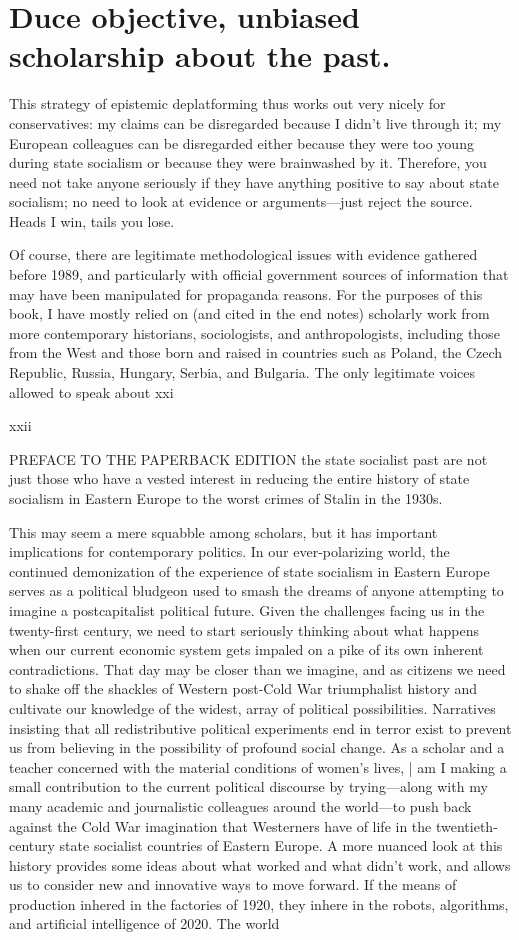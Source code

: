 \section{Duce objective, unbiased scholarship about the past.}
 \par 
This strategy of epistemic deplatforming thus works out very nicely for conservatives: my claims can be disregarded because I didn’t live through it; my European colleagues can be disregarded either because they were too young during state socialism or because they were brainwashed by it. Therefore, you need not take anyone seriously if they have anything positive to say about state socialism; no need to look at evidence or arguments—just reject the source. Heads I win, tails you lose.
 \par 
Of course, there are legitimate methodological issues with evidence gathered before 1989, and particularly with official government sources of information that may have been manipulated for propaganda reasons. For the purposes of this book, I have mostly relied on (and cited in the end notes) scholarly work from more contemporary historians, sociologists, and anthropologists, including those from the West and those born and raised in countries such as Poland, the Czech Republic, Russia, Hungary, Serbia, and Bulgaria. The only legitimate voices allowed to speak about xxi
 \par 
xxii
 \par 
PREFACE TO THE PAPERBACK EDITION the state socialist past are not just those who have a vested interest in reducing the entire history of state socialism in Eastern Europe to the worst crimes of Stalin in the 1930s.
 \par 
This may seem a mere squabble among scholars, but it has important implications for contemporary politics. In our ever-polarizing world, the continued demonization of the experience of state socialism in Eastern Europe serves as a political bludgeon used to smash the dreams of anyone attempting to imagine a postcapitalist political future. Given the challenges facing us in the twenty-first century, we need to start seriously thinking about what happens when our current economic system gets impaled on a pike of its own inherent contradictions. That day may be closer than we imagine, and as citizens we need to shake off the shackles of Western post-Cold War triumphalist history and cultivate our knowledge of the widest, array of political possibilities. Narratives insisting that all redistributive political experiments end in terror exist to prevent us from believing in the possibility of profound social change. As a scholar and a teacher concerned with the material conditions of women’s lives, | am I making a small contribution to the current political discourse by trying—along with my many academic and journalistic colleagues around the world—to push back against the Cold War imagination that Westerners have of life in the twentieth-century state socialist countries of Eastern Europe. A more nuanced look at this history provides some ideas about what worked and what didn’t work, and allows us to consider new and innovative ways to move forward. If the means of production inhered in the factories of 1920, they inhere in the robots, algorithms, and artificial intelligence of 2020. The world
